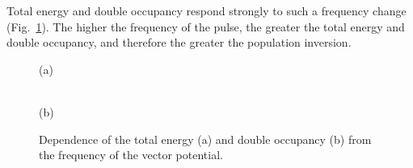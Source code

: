 Total energy and double occupancy respond strongly to such a frequency change (Fig.~\ref{fig:Etot_2}). The higher the frequency of the pulse, the greater the total energy and double occupancy, and therefore the greater the population inversion.
\begin{figure}[h!]
\begin{minipage}[h]{0.5\linewidth}
 (a) \\
\end{minipage}
\hfill
\begin{minipage}[h]{0.5\linewidth}
 \\(b)
\end{minipage}
\caption{Dependence of the total energy (a) and double occupancy (b) from the frequency of the vector potential.}
\label{fig:Etot_2}
\end{figure}

